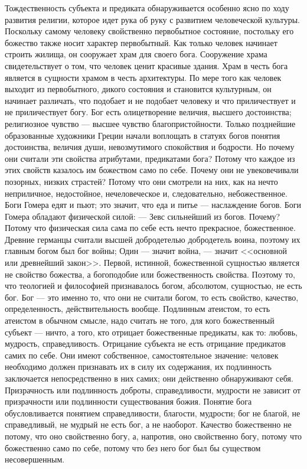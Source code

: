\documentclass[12pt,oneside]{book}
\begin{document}
Тождественность субъекта и предиката обнаруживается особенно ясно по ходу развития религии, которое идет рука об руку с развитием человеческой культуры. Поскольку самому человеку свойственно первобытное состояние, постольку его божество также носит характер первобытный. Как только человек начинает строить жилища, он сооружает храм для своего бога. Сооружение храма свидетельствует о том, что человек ценит красивые здания. Храм в честь бога является в сущности храмом в честь архитектуры. По мере того как человек выходит из первобытного, дикого состояния и становится культурным, он начинает различать, что подобает и не подобает человеку и что приличествует и не приличествует богу. Бог есть олицетворение величия, высшего достоинства; религиозное чувство --- высшее чувство благопристойности. Только позднейшие образованные художники Греции начали воплощать в статуях богов понятия достоинства, величия души, невозмутимого спокойствия и бодрости. Но почему они считали эти свойства атрибутами, предикатами бога? Потому что каждое из этих свойств казалось им божеством само по себе. Почему они не увековечивали позорных, низких страстей? Потому что они смотрели на них, как на нечто неприличное, недостойное, нечеловеческое и, следовательно, небожественное. Боги Гомера едят и пьют; это значит, что еда и питье --- наслаждение богов. Боги Гомера обладают физической силой: --- Зевс сильнейший из богов. Почему? Потому что физическая сила сама по себе есть нечто прекрасное, божественное. Древние германцы считали высшей добродетелью добродетель воина, поэтому их главным богом был бог войны; Один --- значит война, --- значит <<основной или древнейший закон>>. Первой, истинной, божественной сущностью является не свойство божества, а богоподобие или божественность свойства. Поэтому то, что теологией и философией признавалось богом, абсолютом, сущностью, не есть бог. Бог --- это именно то, что они не считали богом, то есть свойство, качество, определенность, действительность вообще. Подлинным атеистом, то есть атеистом в обычном смысле, надо считать не того, для кого божественный субъект --- ничто, а того, кто отрицает божественные предикаты, как то: любовь, мудрость, справедливость. Отрицание субъекта не есть отрицание предикатов самих по себе. Они имеют собственное, самостоятельное значение: человек необходимо должен признавать их в силу их содержания, их подлинность заключается непосредственно в них самих; они действенно обнаруживают себя. Призрачность или подлинность доброты, справедливости, мудрости не зависит от призрачности или подлинности существования божия. Понятие бога обусловливается понятием справедливости, благости, мудрости; бог не благой, не справедливый, не мудрый не есть бог, а не наоборот. Качество божественно не потому, что оно свойственно богу, а, напротив, оно свойственно богу, потому что божественно само по себе, потому что без него бог был бы существом несовершенным.
\end{document}
